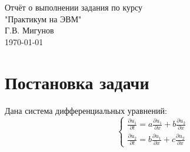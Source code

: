 \documentclass[titlepage]{article}
\def\part{\partial}
\begin{document}
 

\newtheorem{theorem}{Теорема}
\newtheorem{lemma}{Лемма}
\newtheorem{definition}{Определение}
\renewcommand{\proofname}{Доказательство}

\begin{center}
\hfill \break
\hfill \break
\hfill \break
\LARGE Отчёт о выполнении задания по курсу  \\
\LARGE "Практикум на ЭВМ" \\
\hfill \break
\large Г.В. Мигунов \\
\hfill \break
\today \\

\end{center}

\section{Постановка задачи}
Дана система дифференциальных уравнений:
\begin{equation*}
 \begin{cases}
   \frac{\part u_1}{\part t} = a\frac{\part u_1}{\part x} + b\frac{\part u_2}{\part x}
   \\
	\frac{\part u_2}{\part t} = b\frac{\part u_1}{\part x} + c\frac{\part u_2}{\part x}
 \end{cases}
\end{equation*}
\end{document}
